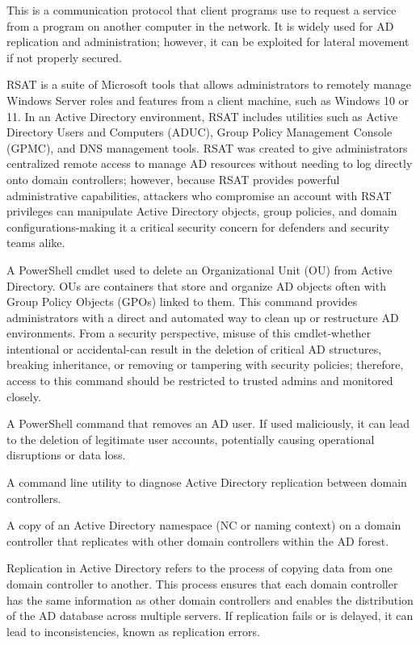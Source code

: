  This is a communication protocol that client programs use to request a service from a program on another computer in the network. It is widely used for AD replication and administration; however, it can be exploited for lateral movement if not properly secured.

 RSAT is a suite of Microsoft tools that allows administrators to remotely manage Windows Server roles and features from a client machine, such as Windows 10 or 11. In an Active Directory environment, RSAT includes utilities such as Active Directory Users and Computers (ADUC), Group Policy Management Console (GPMC), and DNS management tools. RSAT was created to give administrators centralized remote access to manage AD resources without needing to log directly onto domain controllers; however, because RSAT provides powerful administrative capabilities, attackers who compromise an account with RSAT privileges can manipulate Active Directory objects, group policies, and domain configurations-making it a critical security concern for defenders and security teams alike.

 A PowerShell cmdlet used to delete an Organizational Unit (OU) from Active Directory. OUs are containers that store and organize AD objects often with Group Policy Objects (GPOs) linked to them. This command provides administrators with a direct and automated way to clean up or restructure AD environments. From a security perspective, misuse of this cmdlet-whether intentional or accidental-can result in the deletion of critical AD structures, breaking inheritance, or removing or tampering with security policies; therefore, access to this command should be restricted to trusted admins and monitored closely.

 A PowerShell command that removes an AD user. If used maliciously, it can lead to the deletion of legitimate user accounts, potentially causing operational disruptions or data loss.

 A command line utility to diagnose Active Directory replication between domain controllers.

 A copy of an Active Directory namespace (NC or naming context) on a domain controller that replicates with other domain controllers within the AD forest.

 Replication in Active Directory refers to the process of copying data from one domain controller to another. This process ensures that each domain controller has the same information as other domain controllers and enables the distribution of the AD database across multiple servers. If replication fails or is delayed, it can lead to inconsistencies, known as replication errors.

